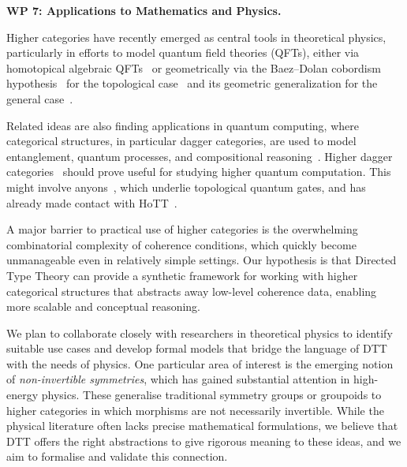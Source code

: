 \documentclass[a4paper,11pt]{article}
\renewcommand{\paragraph}[1]{\textbf{#1.}}
\begin{document}

\paragraph{WP 7: Applications to Mathematics and Physics}

Higher categories have recently emerged as central tools in
theoretical physics, particularly in efforts to model quantum field
theories (QFTs), either via homotopical algebraic QFTs~\cite{benini2017,benini2019}
or geometrically via the Baez--Dolan cobordism hypothesis~\cite{baez-dolan}
for the topological case~\cite{lurie-tft}
and its geometric generalization for the general case~\cite{grady-pavlov}.

Related ideas are also finding applications in quantum
computing, where categorical structures, in particular dagger categories,
are used to model
entanglement, quantum processes, and compositional reasoning~\cite{Abramsky2004}.
Higher dagger categories~\cite{ferrer2024daggerncategories} should prove useful
for studying higher quantum computation. This might involve anyons~\cite{sati-schreiber-2023}, which underlie topological quantum gates,
and has already made contact with HoTT~\cite{Myers2024}.

A major barrier to practical use of higher categories is the
overwhelming combinatorial complexity of coherence conditions, which
quickly become unmanageable even in relatively simple settings. Our
hypothesis is that Directed Type Theory can provide a synthetic
framework for working with higher categorical structures that
abstracts away low-level coherence data, enabling more scalable and
conceptual reasoning.

We plan to collaborate closely with researchers in theoretical physics
to identify suitable use cases and develop formal models that bridge
the language of DTT with the needs of physics. One particular area of
interest is the emerging notion of \emph{non-invertible symmetries},
which has gained substantial attention in high-energy physics. These
generalise traditional symmetry groups or groupoids to higher
categories in which morphisms are not necessarily invertible. While
the physical literature often lacks precise mathematical formulations,
we believe that DTT offers the right abstractions to give rigorous
meaning to these ideas, and we aim to formalise and validate this
connection.
\end{document}

